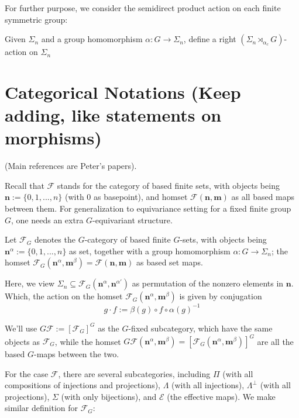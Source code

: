 \documentclass{article}
\begin{document}
\hfil

For further purpose, we consider the semidirect product action on each finite symmetric group:
\begin{defn}
    Given $\Sigma_n$ and a group homomorphism $\alpha:G\rightarrow \Sigma_n$, define a right $(\Sigma_n\rtimes_{\alpha_c}G)$-action on $\Sigma_n$
\end{defn}

\newpage

\section{Categorical Notations (Keep adding, like statements on morphisms)}

(Main references are Peter's papers).

Recall that $\mathscr{F}$ stands for the category of based finite sets, with objects being $\mathbf{n}:= \{0,1,...,n\}$ (with $0$ as basepoint), and homset $\mathscr{F}(\mathbf{n},\mathbf{m})$ as all based maps between them. For generalization to equivariance setting for a fixed finite group $G$, one needs an extra $G$-equivariant structure.

\begin{defn}
    Let $\mathscr{F}_G$ denotes the $G$-category of based finite $G$-sets, with objects being $\mathbf{n}^\alpha:= \{0,1,...,n\}$ as set, together with a group homomorphism $\alpha:G\rightarrow \Sigma_n$; the homset $\mathscr{F}_G(\mathbf{n}^\alpha,\mathbf{m}^\beta)= \mathscr{F}(\mathbf{n},\mathbf{m})$ as based set maps. 
    
    Here, we view $\Sigma_n\subseteq \mathscr{F}_G(\mathbf{n}^\alpha,\mathbf{n}^{\alpha'})$ as permutation of the nonzero elements in $\mathbf{n}$. Which, the action on the homset $\mathscr{F}_G(\mathbf{n}^\alpha,\mathbf{m}^\beta)$ is given by conjugation 
    \[g\cdot f := \beta(g)\circ f\circ \alpha(g)^{-1}\]

    We'll use $G\mathscr{F}:= [\mathscr{F}_G]^G$ as the $G$-fixed subcategory, which have the same objects as $\mathscr{F}_G$, while the homset $G\mathscr{F}(\mathbf{n}^\alpha,\mathbf{m}^\beta) = [\mathscr{F}_G(\mathbf{n}^\alpha,\mathbf{m}^\beta)]^G$ are all the based $G$-maps between the two.
\end{defn}

\hfil

For the case $\mathscr{F}$, there are several subcategories, including $\Pi$ (with all compositions of injections and projections), $\Lambda$ (with all injections), $\Lambda^\perp$ (with all projections), $\Sigma$ (with only bijections), and $\mathscr{E}$ (the effective maps). We make similar definition for $\mathscr{F}_G$:
\end{document}
